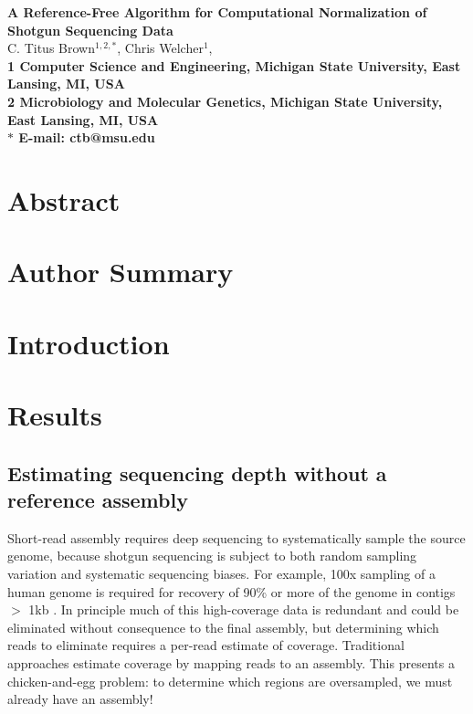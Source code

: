 \documentclass[10pt]{article}
\date{}
\begin{document}
\begin{flushleft}
{\Large
\textbf{A Reference-Free Algorithm for Computational Normalization of Shotgun Sequencing Data}
}
\\
C. Titus Brown$^{1,2,\ast}$,
Chris Welcher$^{1}$,
\\
\bf{1} Computer Science and Engineering, Michigan State University,
East Lansing, MI, USA
\\
\bf{2} Microbiology and Molecular Genetics, Michigan State University,
East Lansing, MI, USA
\\
$\ast$ E-mail: ctb@msu.edu
\end{flushleft}

\section*{Abstract}


\section*{Author Summary}

\section*{Introduction}

\section*{Results}

\subsection*{Estimating sequencing depth without a reference assembly}

Short-read assembly requires deep sequencing to systematically sample
the source genome, because shotgun sequencing is subject to both
random sampling variation and systematic sequencing biases.  For
example, 100x sampling of a human genome is required for recovery of
90\% or more of the genome in contigs $>$ 1kb \cite{pubmed21187386}.
In principle much of this high-coverage data is redundant and could be
eliminated without consequence to the final assembly, but determining
which reads to eliminate requires a per-read estimate of coverage.
Traditional approaches estimate coverage by mapping reads to an
assembly.  This presents a chicken-and-egg problem: to
determine which regions are oversampled, we must already have an
assembly!
\end{document}
